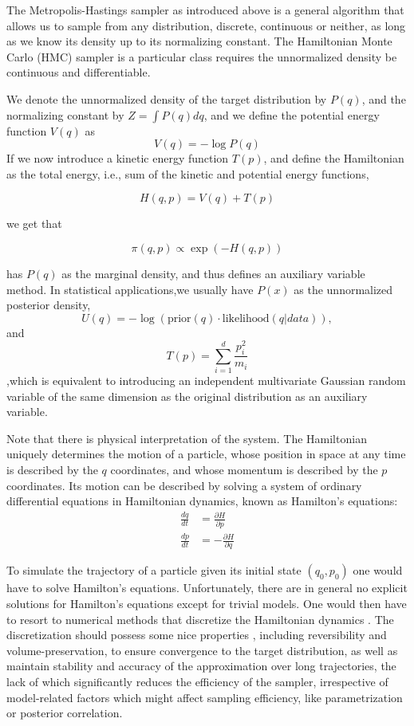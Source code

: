 \documentclass[]{report}
\begin{document}
The Metropolis-Hastings sampler as introduced above is a general algorithm that allows us to sample from any distribution, discrete, continuous or neither, as long as we know its density up to its normalizing constant. The Hamiltonian Monte Carlo (HMC) sampler is a particular class requires the unnormalized density be continuous and differentiable. 


We denote the unnormalized density of the target distribution by $P(q)$, and the normalizing constant by $Z = \int P(q)dq $, and we define the potential energy function $V(q)$ as 
\[ V(q) =  -\log P(q) \]
If we now introduce a kinetic energy function $T(p)$, and define
the Hamiltonian as the total energy, i.e., sum of the kinetic and potential energy functions, 

\[ H(q,p) = V(q) + T(p) \]

we get that 

\[\pi(q,p) \propto  \exp(-H(q,p)) \]

has $P(q)$ as the marginal density, and thus defines an auxiliary variable method. In statistical applications,we usually have $P(x)$ as the unnormalized posterior
density, 
\[U(q) = -\log(\text{prior}(q) \cdot \text{likelihood}(q|data) ), \]
and 
\[T(p) = \sum_{i=1}^d \frac{p_i^2}{m_i} \]
,which is equivalent to introducing an independent multivariate Gaussian random variable of
the same dimension as the original distribution as an auxiliary variable. 

Note that there is physical interpretation of the system. The Hamiltonian uniquely determines the motion of a particle, whose position in space at any time is described by the $q$ coordinates, and whose momentum is described by the $p$ coordinates. Its motion can be described by solving a system of ordinary differential equations in Hamiltonian dynamics, known as Hamilton's equations:
\begin{align}
    \frac{dq}{dt} &= \frac{\partial H}{\partial p } \\
    \frac{dp}{dt} &= -\frac{\partial H}{\partial q}
\end{align}



To simulate the trajectory of a particle given its initial state $(q_0,p_0)$ one
would have to solve Hamilton's equations. Unfortunately, there are in general no
explicit solutions for Hamilton's equations except for trivial models. One would
then have to resort to numerical methods that discretize the Hamiltonian
dynamics \cite{leimkuhler2004simulating}. The discretization should
possess some nice properties , including reversibility and volume-preservation, to ensure convergence to the target distribution, as well as  maintain 
stability and accuracy of the approximation over long trajectories, the lack of which significantly reduces the efficiency of the sampler, irrespective of model-related factors which might affect sampling efficiency, like parametrization or posterior correlation.  
\end{document}
